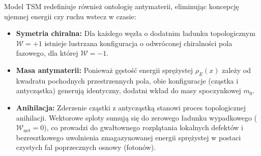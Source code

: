 \documentclass[
  polish,
  letterpaper,
  DIV=11,
  numbers=noendperiod,
  oneside]{scrartcl}
\providecommand{\tightlist}{%
  \setlength{\itemsep}{0pt}\setlength{\parskip}{0pt}}
\begin{document}
Model TSM redefiniuje również ontologię antymaterii, eliminując
koncepcję ujemnej energii czy ruchu wstecz w czasie:

\begin{itemize}
\tightlist
\item
  \textbf{Symetria chiralna:} Dla każdego węzła o dodatnim ładunku
  topologicznym \(\mathcal{W} = +1\) istnieje lustrzana konfiguracja o
  odwróconej chiralności pola fazowego, dla której \(\mathcal{W} = -1\).
\item
  \textbf{Masa antymaterii:} Ponieważ gęstość energii sprężystej
  \(\rho_{E}(x)\) zależy od kwadratu pochodnych przestrzennych pola,
  obie konfiguracje (cząstka i antycząstka) generują identyczny, dodatni
  wkład do masy spoczynkowej \(m_0\).
\item
  \textbf{Anihilacja:} Zderzenie cząstki z antycząstką stanowi proces
  topologicznej anihilacji. Wektorowe sploty sumują się do zerowego
  ładunku wypadkowego (\(\mathcal{W}_{\text{net}} = 0\)), co prowadzi do
  gwałtownego rozplątania lokalnych defektów i bezresztkowego uwolnienia
  zmagazynowanej energii sprężystej w postaci czystych fal poprzecznych
  osnowy (fotonów).
\end{itemize}
\end{document}
